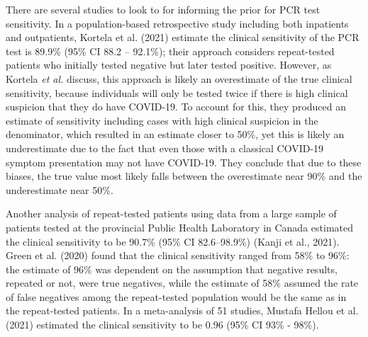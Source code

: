 \documentclass[12pt,twoside]{smiththesis}
\begin{document}
There are several studies to look to for informing the prior for PCR test sensitivity. In a population-based retrospective study including both inpatients and outpatients, Kortela et al. (2021) estimate the clinical sensitivity of the PCR test is 89.9\% (95\% CI 88.2 -- 92.1\%); their approach considers repeat-tested patients who initially tested negative but later tested positive. However, as Kortela \emph{et al.} discuss, this approach is likely an overestimate of the true clinical sensitivity, because individuals will only be tested twice if there is high clinical suspicion that they do have COVID-19. To account for this, they produced an estimate of sensitivity including cases with high clinical suspicion in the denominator, which resulted in an estimate closer to 50\%, yet this is likely an underestimate due to the fact that even those with a classical COVID-19 symptom presentation may not have COVID-19. They conclude that due to these biases, the true value most likely falls between the overestimate near 90\% and the underestimate near 50\%.

Another analysis of repeat-tested patients using data from a large sample of patients tested at the provincial Public Health Laboratory in Canada estimated the clinical sensitivity to be 90.7\% (95\% CI 82.6--98.9\%) (Kanji et al., 2021). Green et al. (2020) found that the clinical sensitivity ranged from 58\% to 96\%: the estimate of 96\% was dependent on the assumption that negative results, repeated or not, were true negatives, while the estimate of 58\% assumed the rate of false negatives among the repeat-tested population would be the same as in the repeat-tested patients. In a meta-analysis of 51 studies, Mustafa Hellou et al. (2021) estimated the clinical sensitivity to be 0.96 (95\% CI 93\% - 98\%).
\end{document}
